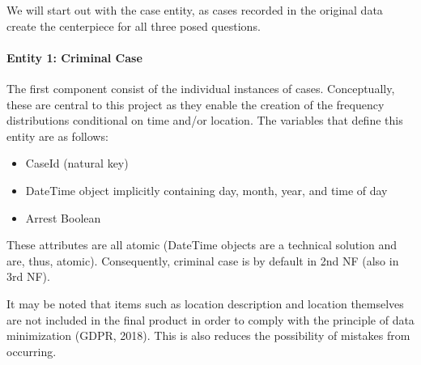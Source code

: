 \documentclass[a4paper]{article}
\begin{document}
We will start out with the case entity, as cases recorded in the original data create the centerpiece for all three posed questions.



\paragraph{Entity 1: Criminal Case} The first component consist of the individual instances of cases. Conceptually, these are central to this project as they enable the creation of the frequency distributions conditional on time and/or location. The variables that define this entity are as follows:

\begin{itemize}
  \item CaseId (natural key)
  \item DateTime object implicitly containing day, month, year, and time of day 
  \item Arrest Boolean  
\end{itemize}

These attributes are all atomic (DateTime objects are a technical solution and are, thus, atomic). Consequently, criminal case is by default in 2nd NF (also in 3rd NF). 

It may be noted that items such as location description and location themselves are not included in the final product in order to comply with the principle of data minimization (GDPR, 2018). This is also reduces the possibility of mistakes from occurring. 
\end{document}
